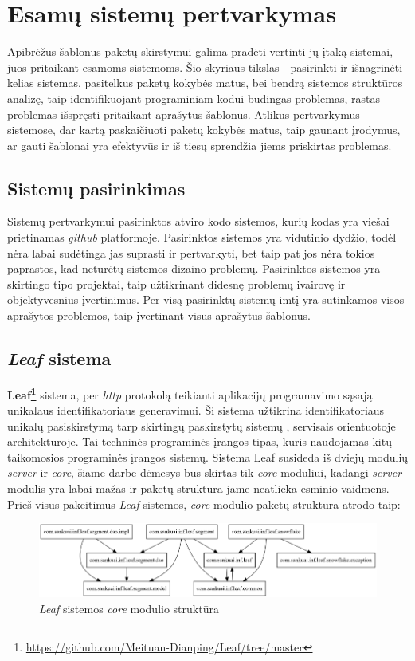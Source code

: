 \section{Esamų sistemų pertvarkymas}
Apibrėžus šablonus paketų skirstymui galima pradėti vertinti jų įtaką sistemai, juos pritaikant esamoms sistemoms.
Šio skyriaus tikslas - pasirinkti ir išnagrinėti kelias sistemas, pasitelkus paketų kokybės matus, bei bendrą sistemos struktūros analizę,
taip identifikuojant programiniam kodui būdingas problemas, rastas problemas išspręsti pritaikant aprašytus šablonus.
Atlikus pertvarkymus sistemose, dar kartą paskaičiuoti paketų kokybės matus,
taip gaunant įrodymus, ar gauti šablonai yra efektyvūs ir iš tiesų sprendžia
jiems priskirtas problemas.


\subsection{Sistemų pasirinkimas}
Sistemų pertvarkymui pasirinktos atviro kodo sistemos, kurių kodas yra viešai prietinamas \textit{github} platformoje.
Pasirinktos sistemos yra vidutinio dydžio, todėl nėra labai sudėtinga jas suprasti ir pertvarkyti, bet taip pat jos nėra
tokios paprastos, kad neturėtų sistemos dizaino problemų.
Pasirinktos sistemos yra skirtingo tipo projektai, taip užtikrinant didesnę problemų ivairovę ir objektyvesnius įvertinimus.
Per visą pasirinktų sistemų imtį yra sutinkamos visos aprašytos problemos, taip įvertinant visus aprašytus šablonus.

\subsection{\textit{Leaf} sistema}
\textbf{Leaf\footnote{\url{https://github.com/Meituan-Dianping/Leaf/tree/master}}} sistema, per \textit{http}
protokolą teikianti aplikacijų programavimo sąsają unikalaus identifikatoriaus generavimui.
Ši sistema užtikrina identifikatoriaus unikalų pasiskirstymą tarp skirtingų paskirstytų sistemų ,
servisais orientuotoje  architektūroje.
Tai techninės programinės įrangos tipas, kuris naudojamas kitų taikomosios programinės įrangos sistemų.
Sistema Leaf susideda iš dviejų modulių \textit{server} ir \textit{core}, šiame darbe dėmesys bus skirtas tik \textit{core} moduliui,
kadangi \textit{server} modulis yra labai mažas
ir paketų struktūra jame neatlieka esminio vaidmens.
Prieš visus pakeitimus \textit{Leaf} sistemos, \textit{core} modulio paketų struktūra atrodo taip:
\begin{figure}[H]
    \centering
    \includegraphics[scale=0.5]{img/leaf_packages_orig}
    \caption{\textit{Leaf} sistemos \textit{core} modulio struktūra}
    \label{img:leaf_packages_orig}
\end{figure}

